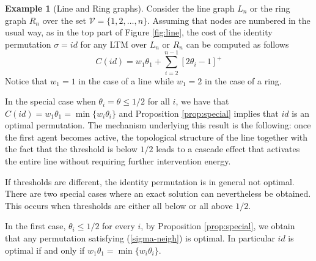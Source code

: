 \documentclass[12pt,twoside,reqno]{amsart}
\theoremstyle{definition}
\newtheorem{example}[theorem]{Example}
\numberwithin{equation}{section}
\newcommand{\be}{\begin{equation}}
\newcommand{\ee}{\end{equation}}
\newcommand{\mc}{\mathcal}
\newcommand{\0}{\mathbf{0}}
\newcommand{\1}{\mathbf{1}}
\newcommand{\infl}{h}
\newcommand{\thre}{\theta}
\newcommand{\Thre}{\mathbf{\theta}}
\DeclareMathOperator*{\argmin}{argmin}
\begin{document}
\begin{example}[Line and Ring graphs]\label{ex:ring0}\label{ex:ring1} Consider the line graph $L_n$ or the ring graph $R_{n}$ over the set $\mc V=\{1,2,\dots , n\}$. 
Assuming that nodes are numbered in the usual way, as in the top part of Figure \ref{fig:line},
the cost of the identity permutation $\sigma=id$ for any LTM over $L_n$ or $R_n$ can be computed as follows
\be\label{trivial-line}
C({id})=w_1\thre_1+\sum\limits_{i=2}^{n-1}[2\thre_i-1]^+\ee
Notice that $w_1=1$ in the case of a line while $w_1=2$ in the case of a ring. 

In the special case when $\thre_i=\theta\leq 1/2$ for all $i$, we have that $C({id})=w_1\thre_1=\min\{w_i\thre_i\}$ and Proposition \ref{prop:special} implies that $id$ is an optimal permutation.
%
%
The mechanism underlying this result is the following: once the first agent becomes active, the topological structure of the line together with the fact that the threshold is below $1/2$ leads to a cascade effect that activates the entire line without requiring further intervention energy.

If thresholds are different, the identity permutation is in general not optimal. There are two special cases where an exact solution can nevertheless be obtained. This occurs when thresholds are either all below or all above $1/2$.


In the first case, $\thre_i\leq 1/2$ for every $i$, by Proposition \ref{prop:special}, we obtain that any permutation satisfying (\ref{sigma-neigh}) is optimal. In particular $id$ is optimal if and only if $w_1\thre_1=\min\{w_i\thre_i\}$.
%


\end{example}
\end{document}
